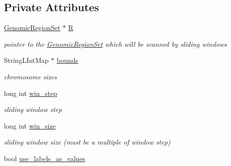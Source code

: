 \subsection*{Private Attributes}
\begin{CompactItemize}
\item 
\hypertarget{classGenomicRegionSetScanner_f76bf4fef482886f23f58cfa12c3eea1}{
\hyperlink{classGenomicRegionSet}{GenomicRegionSet} $\ast$ \hyperlink{classGenomicRegionSetScanner_f76bf4fef482886f23f58cfa12c3eea1}{R}}
\label{classGenomicRegionSetScanner_f76bf4fef482886f23f58cfa12c3eea1}

\begin{CompactList}\small\item\em pointer to the \hyperlink{classGenomicRegionSet}{GenomicRegionSet} which will be scanned by sliding windows \item\end{CompactList}\item 
\hypertarget{classGenomicRegionSetScanner_7f64551c26331cd4ead1ab01405f1b72}{
StringLIntMap $\ast$ \hyperlink{classGenomicRegionSetScanner_7f64551c26331cd4ead1ab01405f1b72}{bounds}}
\label{classGenomicRegionSetScanner_7f64551c26331cd4ead1ab01405f1b72}

\begin{CompactList}\small\item\em chromosome sizes \item\end{CompactList}\item 
\hypertarget{classGenomicRegionSetScanner_b278dfa27c3589865b9243156c1c727f}{
long int \hyperlink{classGenomicRegionSetScanner_b278dfa27c3589865b9243156c1c727f}{win\_\-step}}
\label{classGenomicRegionSetScanner_b278dfa27c3589865b9243156c1c727f}

\begin{CompactList}\small\item\em sliding window step \item\end{CompactList}\item 
\hypertarget{classGenomicRegionSetScanner_eed625b2a12aa2f7900997c4e20cd9b5}{
long int \hyperlink{classGenomicRegionSetScanner_eed625b2a12aa2f7900997c4e20cd9b5}{win\_\-size}}
\label{classGenomicRegionSetScanner_eed625b2a12aa2f7900997c4e20cd9b5}

\begin{CompactList}\small\item\em sliding window size (must be a multiple of window step) \item\end{CompactList}\item 
\hypertarget{classGenomicRegionSetScanner_d47603d08614ab993fe9036662c421e7}{
bool \hyperlink{classGenomicRegionSetScanner_d47603d08614ab993fe9036662c421e7}{use\_\-labels\_\-as\_\-values}}
\label{classGenomicRegionSetScanner_d47603d08614ab993fe9036662c421e7}


\end{CompactItemize}
